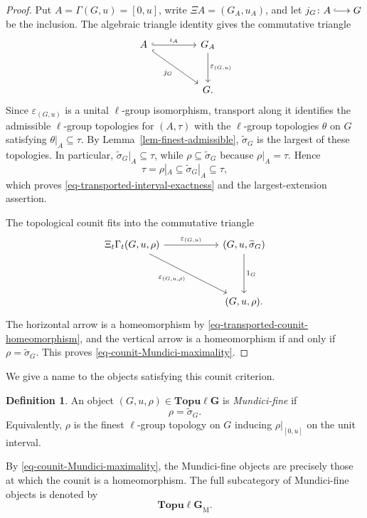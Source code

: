 \documentclass[preprint,3p]{elsarticle}
\theoremstyle{plain}
\theoremstyle{definition}
\newtheorem{defn}[thm]{Definition}
\newcommand{\longhookrightarrow}{\lhook\joinrel\longrightarrow}
\newcommand{\Topulg}{\mathbf{Topu\ell G}}
\newcommand{\TopulgM}{\mathbf{Topu\ell G}_{\mathrm{M}}}
\numberwithin{equation}{section}
\begin{document}
\begin{proof}
Put $A=\Gamma(G,u)=[0,u]$, write $\Xi A=(G_A,u_A)$, and let
$j_G\colon A\longhookrightarrow G$ be the inclusion.
The algebraic triangle identity gives the commutative triangle
\[
\begin{tikzcd}[column sep=4.5em,row sep=3em]
A
  \arrow[r,hook,"\iota_A"]
  \arrow[dr,hook,"j_G"']
&
G_A
  \arrow[d,"\varepsilon_{(G,u)}"]
\\
&
G.
\end{tikzcd}
\]
Since $\varepsilon_{(G,u)}$ is a unital $\ell$-group isomorphism,
transport along it identifies the admissible $\ell$-group topologies
for $(A,\tau)$ with the $\ell$-group topologies $\theta$ on $G$
satisfying $\theta|_A\subseteq\tau$.
By Lemma~\ref{lem-finest-admissible}, $\widetilde\sigma_G$ is the
largest of these topologies.
In particular, $\widetilde\sigma_G|_A\subseteq\tau$, while
$\rho\subseteq\widetilde\sigma_G$ because $\rho|_A=\tau$.
Hence
\[
 \tau=\rho|_A\subseteq\widetilde\sigma_G|_A\subseteq\tau,
\]
which proves \eqref{eq-transported-interval-exactness} and the
largest-extension assertion.

The topological counit fits into the commutative triangle
\begin{equation}
\label{eq-transported-counit-factorization}
\begin{tikzcd}[column sep=5.5em,row sep=4em]
\Xi_t\Gamma_t(G,u,\rho)
  \arrow[r,"\varepsilon_{(G,u)}"]
  \arrow[dr,"\varepsilon_{(G,u,\rho)}"']
&
(G,u,\widetilde\sigma_G)
  \arrow[d,"1_G"]
\\
&
(G,u,\rho).
\end{tikzcd}
\end{equation}
The horizontal arrow is a homeomorphism by
\eqref{eq-transported-counit-homeomorphism}, and the vertical arrow is a
homeomorphism if and only if $\rho=\widetilde\sigma_G$.
This proves \eqref{eq-counit-Mundici-maximality}.
\end{proof}

We give a name to the objects satisfying this counit criterion.

\begin{defn}
An object $(G,u,\rho)\in\Topulg$ is \emph{Mundici-fine} if
\[
 \rho=\widetilde\sigma_G.
\]
Equivalently, $\rho$ is the finest $\ell$-group topology on $G$
inducing $\rho|_{[0,u]}$ on the unit interval.
\end{defn}

By \eqref{eq-counit-Mundici-maximality}, the Mundici-fine objects are
precisely those at which the counit is a homeomorphism.
The full subcategory of Mundici-fine objects is denoted by
\[
 \TopulgM.
\]
\end{document}
